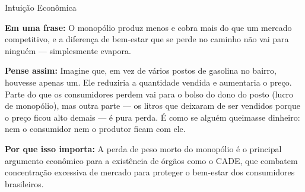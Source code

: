 \documentclass[11pt,twoside,openright]{book}
\begin{document}
\begin{intuitionbox}{Intuição Econômica}

\textbf{Em uma frase:} O monopólio produz menos e cobra mais do que um
mercado competitivo, e a diferença de bem-estar que se perde no caminho
não vai para ninguém --- simplesmente evapora.

\textbf{Pense assim:} Imagine que, em vez de vários postos de gasolina
no bairro, houvesse apenas um. Ele reduziria a quantidade vendida e
aumentaria o preço. Parte do que os consumidores perdem vai para o bolso
do dono do posto (lucro de monopólio), mas outra parte --- os litros que
deixaram de ser vendidos porque o preço ficou alto demais --- é pura
perda. É como se alguém queimasse dinheiro: nem o consumidor nem o
produtor ficam com ele.

\textbf{Por que isso importa:} A perda de peso morto do monopólio é o
principal argumento econômico para a existência de órgãos como o CADE,
que combatem concentração excessiva de mercado para proteger o bem-estar
dos consumidores brasileiros.

\end{intuitionbox}
\end{document}
